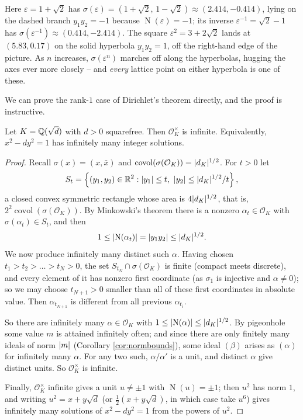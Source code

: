 \documentclass[a4paper]{scrartcl}
\renewcommand{\OO}{\mathcal{O}}
\newcommand{\Nm}{\operatorname{N}}
\newcommand{\covol}{\operatorname{covol}}
\begin{document}
Here $\varepsilon = 1+\sqrt2$ has $\sigma(\varepsilon) = (1+\sqrt2,\,1-\sqrt2)\approx(2.414,-0.414)$, lying on the dashed branch $y_1y_2 = -1$ because $\Nm(\varepsilon) = -1$; its inverse $\varepsilon^{-1} = \sqrt2-1$ has $\sigma(\varepsilon^{-1}) \approx (0.414,-2.414)$. The square $\varepsilon^2 = 3+2\sqrt2$ lands at $(5.83, 0.17)$ on the solid hyperbola $y_1y_2 = 1$, off the right-hand edge of the picture. As $n$ increases, $\sigma(\varepsilon^n)$ marches off along the hyperbolas, hugging the axes ever more closely -- and \emph{every} lattice point on either hyperbola is one of these.

We can prove the rank-$1$ case of Dirichlet's theorem directly, and the proof is instructive.

\begin{theorem}[Pell]\label{nf-thm:pell}
	Let $K = \mathbb{Q}(\sqrt d)$ with $d > 0$ squarefree. Then $\OO_K^\times$ is infinite. Equivalently, $x^2-dy^2 = 1$ has infinitely many integer solutions.
\end{theorem}

\begin{proof}
	Recall $\sigma(x) = (x,\bar x)$ and $\covol(\sigma(\OO_K)) = \abs{d_K}^{1/2}$. For $t > 0$ let
	$$S_t = \left\{(y_1,y_2) \in \mathbb{R}^2 : \lvert y_1\rvert\le t,\ \lvert y_2\rvert\le \lvert d_K\rvert^{1/2}/t\right\},$$
	a closed convex symmetric rectangle whose area is $4\lvert d_K\rvert^{1/2}$, that is, $2^2\covol(\sigma(\OO_K))$. By Minkowski's theorem there is a nonzero $\alpha_t \in \OO_K$ with $\sigma(\alpha_t)\in S_t$, and then
	$$1 \le \abs{\Nm(\alpha_t)} = \abs{y_1y_2} \le \abs{d_K}^{1/2}.$$
	We now produce infinitely many distinct such $\alpha$. Having chosen $t_1 > t_2 > \dots > t_N > 0$, the set $S_{t_N}\cap\sigma(\OO_K)$ is finite (compact meets discrete), and every element of it has nonzero first coordinate (as $\sigma_1$ is injective and $\alpha \neq 0$); so we may choose $t_{N+1} > 0$ smaller than all of these first coordinates in absolute value. Then $\alpha_{t_{N+1}}$ is different from all previous $\alpha_{t_i}$.

	So there are infinitely many $\alpha \in \OO_K$ with $1 \le \abs{\Nm(\alpha)}\le\abs{d_K}^{1/2}$. By pigeonhole some value $m$ is attained infinitely often; and since there are only finitely many ideals of norm $\lvert m\rvert$ (Corollary \ref{cor:normbounds}), some ideal $(\beta)$ arises as $(\alpha)$ for infinitely many $\alpha$. For any two such, $\alpha/\alpha'$ is a unit, and distinct $\alpha$ give distinct units. So $\OO_K^\times$ is infinite.

	Finally, $\OO_K^\times$ infinite gives a unit $u \neq \pm1$ with $\Nm(u) = \pm1$; then $u^2$ has norm $1$, and writing $u^2 = x+y\sqrt d$ (or $\tfrac12(x+y\sqrt d)$, in which case take $u^6$) gives infinitely many solutions of $x^2-dy^2=1$ from the powers of $u^2$.
\end{proof}
\end{document}
